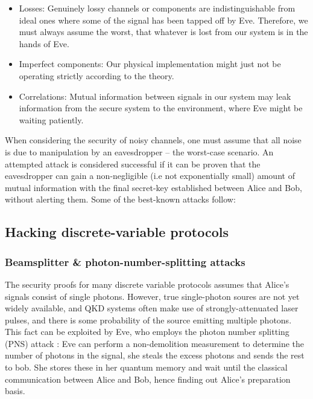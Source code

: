 \begin{itemize}
	\item Losses: Genuinely lossy channels or components are indistinguishable from ideal ones where some of the signal has been tapped off by Eve. Therefore, we must always assume the worst, that whatever is lost from our system is in the hands of Eve.
	\item Imperfect components: Our physical implementation might just not be operating strictly according to the theory.
	\item Correlations: Mutual information between signals in our system may leak information from the secure system to the environment, where Eve might be waiting patiently.
\end{itemize}

When considering the security of noisy channels, one must assume that all noise is due to manipulation by an eavesdropper -- the worst-case scenario. An attempted attack is considered successful if it can be proven that the eavesdropper can gain a non-negligible (i.e not exponentially small) amount of mutual information with the final secret-key established between Alice and Bob, without alerting them. Some of the best-known attacks follow:

\subsection{Hacking discrete-variable protocols}

\subsubsection{Beamsplitter \& photon-number-splitting attacks}

The security proofs for many discrete variable protocols assumes that Alice's signals consist of single photons. However, true single-photon soures are not yet widely available, and QKD systems often make use of strongly-attenuated laser pulses, and there is some probability of the source emitting multiple photons. This fact can be exploited 
by Eve, who employs the photon number splitting (PNS) attack \cite{bib:PhysRevLett.68.3121}: Eve can perform a non-demolition measurement to determine the number of photons 
in the signal, she steals the excess photons and sends the rest to bob. She stores these in her quantum memory and wait until the classical communication between Alice and Bob, hence finding out Alice's preparation basis. 

